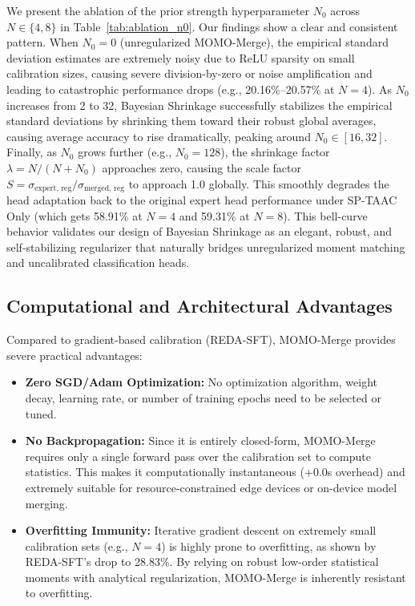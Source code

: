 \documentclass{article}
\theoremstyle{plain}
\theoremstyle{definition}
\theoremstyle{remark}
\begin{document}
We present the ablation of the prior strength hyperparameter $N_0$ across $N \in \{4, 8\}$ in Table~\ref{tab:ablation_n0}. Our findings show a clear and consistent pattern. When $N_0=0$ (unregularized MOMO-Merge), the empirical standard deviation estimates are extremely noisy due to ReLU sparsity on small calibration sizes, causing severe division-by-zero or noise amplification and leading to catastrophic performance drops (e.g., 20.16\%--20.57\% at $N=4$). As $N_0$ increases from 2 to 32, Bayesian Shrinkage successfully stabilizes the empirical standard deviations by shrinking them toward their robust global averages, causing average accuracy to rise dramatically, peaking around $N_0 \in [16, 32]$. Finally, as $N_0$ grows further (e.g., $N_0 = 128$), the shrinkage factor $\lambda = N/(N+N_0)$ approaches zero, causing the scale factor $S = \sigma_{\text{expert, reg}} / \sigma_{\text{merged, reg}}$ to approach 1.0 globally. This smoothly degrades the head adaptation back to the original expert head performance under SP-TAAC Only (which gets 58.91\% at $N=4$ and 59.31\% at $N=8$). This bell-curve behavior validates our design of Bayesian Shrinkage as an elegant, robust, and self-stabilizing regularizer that naturally bridges unregularized moment matching and uncalibrated classification heads.

\subsection{Computational and Architectural Advantages}
\label{subsec:advantages}

Compared to gradient-based calibration (REDA-SFT), MOMO-Merge provides severe practical advantages:
\begin{itemize}
  \item \textbf{Zero SGD/Adam Optimization:} No optimization algorithm, weight decay, learning rate, or number of training epochs need to be selected or tuned.
  \item \textbf{No Backpropagation:} Since it is entirely closed-form, MOMO-Merge requires only a single forward pass over the calibration set to compute statistics. This makes it computationally instantaneous (+0.0s overhead) and extremely suitable for resource-constrained edge devices or on-device model merging.
  \item \textbf{Overfitting Immunity:} Iterative gradient descent on extremely small calibration sets (e.g., $N=4$) is highly prone to overfitting, as shown by REDA-SFT's drop to 28.83\%. By relying on robust low-order statistical moments with analytical regularization, MOMO-Merge is inherently resistant to overfitting.
\end{itemize}
\end{document}
